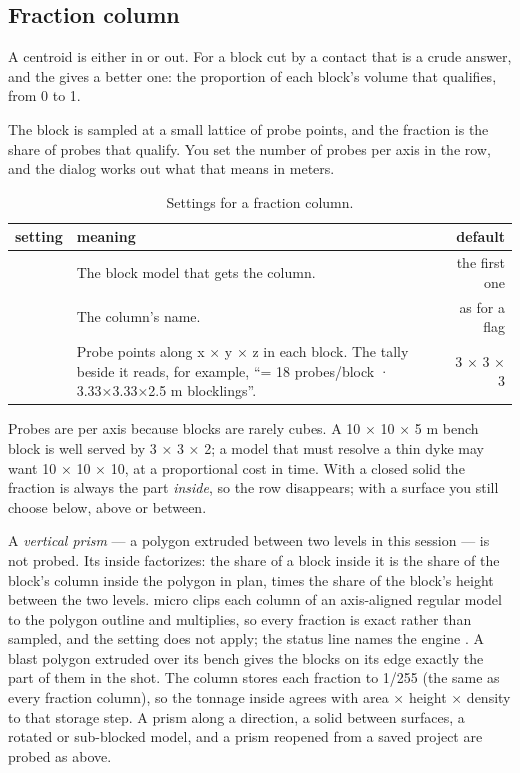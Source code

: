 \subsection{Fraction column}

A centroid is either in or out. For a block cut by a contact that is a crude answer, and the  gives a better one: the proportion of each block's volume that qualifies, from 0 to 1.

The block is sampled at a small lattice of probe points, and the fraction is the share of probes that qualify. You set the number of probes per axis in the  row, and the dialog works out what that means in meters.

\begin{table}[htbp]\small
\begin{tabularx}{\linewidth}{@{}lMD@{}}\toprule
setting & meaning & default \\ \midrule
{} & The block model that gets the column. & the first one \\
 & The column's name. & as for a flag \\
 & Probe points along x × y × z in each block. The tally beside it reads, for example, “= 18 probes/block · 3.33×3.33×2.5 m blocklings”. & 3 × 3 × 3 \\ \bottomrule
\end{tabularx}
\caption{Settings for a fraction column.}\label{tab:geometry-ratio}
\end{table}

Probes are per axis because blocks are rarely cubes. A 10 × 10 × 5 m bench block is well served by 3 × 3 × 2; a model that must resolve a thin dyke may want 10 × 10 × 10, at a proportional cost in time. With a closed solid the fraction is always the part \emph{inside}, so the  row disappears; with a surface you still choose below, above or between.

\begin{note}
A \emph{vertical prism} --- a polygon extruded between two levels in this session --- is not probed. Its inside factorizes: the share of a block inside it is the share of the block's column inside the polygon in plan, times the share of the block's height between the two levels. micro clips each column of an axis-aligned regular model to the polygon outline and multiplies, so every fraction is exact rather than sampled, and the  setting does not apply; the status line names the engine . A blast polygon extruded over its bench gives the blocks on its edge exactly the part of them in the shot. The column stores each fraction to 1/255 (the same as every fraction column), so the tonnage inside agrees with area × height × density to that storage step. A prism along a direction, a solid between surfaces, a rotated or sub-blocked model, and a prism reopened from a saved project are probed as above.
\end{note}


